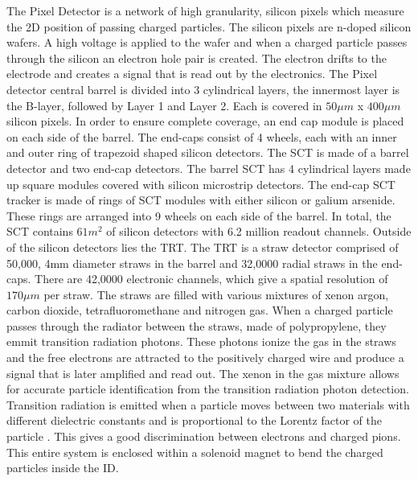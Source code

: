\indent The Pixel Detector is a network of high granularity, silicon pixels which measure the 2D position of passing charged particles. The silicon pixels are n-doped silicon wafers. A high voltage is applied to the wafer and when a charged particle passes through the silicon an electron hole pair is created. The electron drifts to the electrode and creates a signal that is read out by the electronics.  The Pixel detector central barrel is divided into 3 cylindrical layers, the innermost layer is the B-layer, followed by Layer 1 and Layer 2. Each is covered in ${50\mu{m}}$ x ${400\mu{m}}$ silicon pixels. In order to ensure complete coverage, an end cap module is placed on each side of the barrel. The end-caps consist of 4 wheels, each with an inner and outer ring of trapezoid shaped silicon detectors. \linebreak
\indent The SCT is made of a barrel detector and two end-cap detectors. The barrel SCT has 4 cylindrical layers made up square modules covered with silicon microstrip detectors. 
The end-cap SCT tracker is made of rings of SCT modules with either silicon or galium arsenide. These rings are arranged into 9 wheels on each side of the barrel. In total, the SCT contains ${61 m^{2}}$ of silicon detectors with 6.2 million readout channels.\linebreak
\indent Outside of the silicon detectors lies the TRT. The TRT is a straw detector comprised of 50,000, 4mm diameter straws in the barrel and 32,0000 radial straws in the end-caps. There are 42,0000 electronic channels, which give a spatial resolution of ${170\mu{m}}$ per straw. The straws are filled with various mixtures of xenon argon, carbon dioxide, tetrafluoromethane and nitrogen gas. When a charged particle passes through the radiator between the straws, made of polypropylene, they emmit transition radiation photons. These photons ionize the gas in the straws and the free electrons are attracted to the positively charged wire and produce a signal that is later amplified and read out. The xenon in the gas mixture allows for accurate particle identification from the transition radiation photon detection. Transition radiation is emitted when a particle moves between two materials with different dielectric constants and is proportional to the Lorentz factor of the particle \cite{DOLGOSHEIN1993434}. This gives a good discrimination between electrons and charged pions. This entire system is enclosed within a solenoid magnet to bend the charged particles inside the ID.\linebreak

